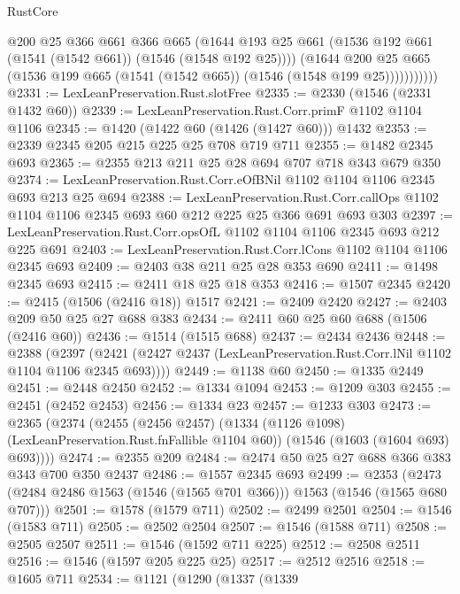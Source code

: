 \begin{lexlean}{RustCore}
\begin{coremodule}
                  @200
                  @25
                  @366
                  @661
                  @366
                  @665
                  (@1644
                    @193
                    @25
                    @661
                    (@1536 @192 @661 (@1541 (@1542 @661)) (@1546 (@1548 @192 @25))))
                  (@1644
                    @200
                    @25
                    @665
                    (@1536 @199 @665 (@1541 (@1542 @665)) (@1546 (@1548 @199 @25)))))))))))
@2331 := LexLeanPreservation.Rust.slotFree
@2335 := @2330 (@1546 (@2331 @1432 @60))
@2339 := LexLeanPreservation.Rust.Corr.primF @1102 @1104 @1106
@2345 := @1420 (@1422 @60 (@1426 (@1427 @60))) @1432
@2353 := @2339 @2345 @205 @215 @225 @25 @708 @719 @711
@2355 := @1482 @2345 @693
@2365 := @2355 @213 @211 @25 @28 @694 @707 @718 @343 @679 @350
@2374 := LexLeanPreservation.Rust.Corr.eOfBNil @1102 @1104 @1106 @2345 @693 @213 @25 @694
@2388 := LexLeanPreservation.Rust.Corr.callOps
    @1102
    @1104
    @1106
    @2345
    @693
    @60
    @212
    @225
    @25
    @366
    @691
    @693
    @303
@2397 := LexLeanPreservation.Rust.Corr.opsOfL @1102 @1104 @1106 @2345 @693 @212 @225 @691
@2403 := LexLeanPreservation.Rust.Corr.lCons @1102 @1104 @1106 @2345 @693
@2409 := @2403 @38 @211 @25 @28 @353 @690
@2411 := @1498 @2345 @693
@2415 := @2411 @18 @25 @18 @353
@2416 := @1507 @2345
@2420 := @2415 (@1506 (@2416 @18)) @1517
@2421 := @2409 @2420
@2427 := @2403 @209 @50 @25 @27 @688 @383
@2434 := @2411 @60 @25 @60 @688 (@1506 (@2416 @60))
@2436 := @1514 (@1515 @688)
@2437 := @2434 @2436
@2448 := @2388
    (@2397 (@2421 (@2427 @2437 (LexLeanPreservation.Rust.Corr.lNil @1102 @1104 @1106 @2345 @693))))
@2449 := @1138 @60
@2450 := @1335 @2449
@2451 := @2448 @2450
@2452 := @1334 @1094
@2453 := @1209 @303
@2455 := @2451 (@2452 @2453)
@2456 := @1334 @23
@2457 := @1233 @303
@2473 := @2365
    (@2374
      (@2455
        (@2456 @2457)
        (@1334 (@1126 @1098) (LexLeanPreservation.Rust.fnFallible @1104 @60))
        (@1546 (@1603 (@1604 @693) @693))))
@2474 := @2355 @209
@2484 := @2474 @50 @25 @27 @688 @366 @383 @343 @700 @350 @2437
@2486 := @1557 @2345 @693
@2499 := @2353 (@2473 (@2484 @2486 @1563 (@1546 (@1565 @701 @366))) @1563 (@1546 (@1565 @680 @707)))
@2501 := @1578 (@1579 @711)
@2502 := @2499 @2501
@2504 := @1546 (@1583 @711)
@2505 := @2502 @2504
@2507 := @1546 (@1588 @711)
@2508 := @2505 @2507
@2511 := @1546 (@1592 @711 @225)
@2512 := @2508 @2511
@2516 := @1546 (@1597 @205 @225 @25)
@2517 := @2512 @2516
@2518 := @1605 @711
@2534 := @1121
    (@1290
      (@1337
        (@1339

\end{coremodule}
\end{lexlean}

